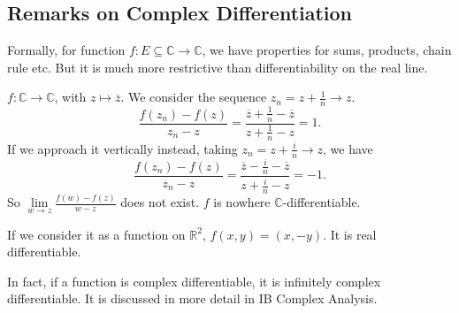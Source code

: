 \subsection{Remarks on Complex Differentiation}
Formally, for function \(f: E \subseteq \mathbb{C} \to \mathbb{C}\), we have properties for sums, products, chain rule etc. But it is much more restrictive than differentiability on the real line.
\begin{example}
    \(f: \mathbb{C} \to \mathbb{C}\), with \(z \mapsto \overline{z}\). We consider the sequence \(z_n = z + \frac{1}{n} \to z\).
    \[
        \frac{f(z_n) - f(z)}{z_{n}-z} = \frac{\overline{z}+\frac{1}{n}-\overline{z}}{z + \frac{1}{n}-z} = 1.
    \]
    If we approach it vertically instead, taking \(z_n = z + \frac{i}{n}\to z\), we have
    \[
        \frac{f(z_n)-f(z)}{z_n - z} = \frac{\overline{z} - \frac{i}{n}-\overline{z}}{z + \frac{i}{n}-z} = -1.
    \]
    So \(\lim\limits_{w \to z} \frac{f(w)-f(z)}{w-z}\) does not exist. \(f\) is nowhere \(\mathbb{C}\)-differentiable.

    If we consider it as a function on \(\mathbb{R}^2\), \(f(x,y)=(x,-y)\). It is real differentiable.

    In fact, if a function is complex differentiable, it is infinitely complex differentiable. It is discussed in more detail in IB Complex Analysis.
\end{example}